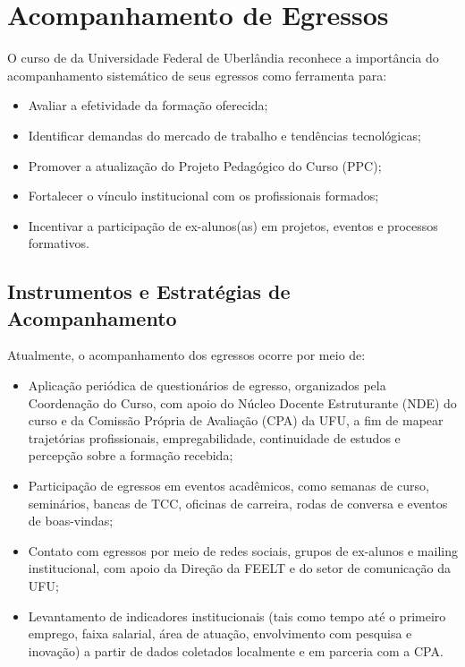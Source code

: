 \chapter{Acompanhamento de Egressos}

O curso de \nomecursonovo da Universidade Federal de Uberlândia reconhece a importância do acompanhamento sistemático de seus egressos como ferramenta para:

\begin{itemize}
    \item Avaliar a efetividade da formação oferecida;
    \item Identificar demandas do mercado de trabalho e tendências tecnológicas;
    \item Promover a atualização do Projeto Pedagógico do Curso (PPC);
    \item Fortalecer o vínculo institucional com os profissionais formados;
    \item Incentivar a participação de ex-alunos(as) em projetos, eventos e processos formativos.
\end{itemize}

\section{Instrumentos e Estratégias de Acompanhamento}

Atualmente, o acompanhamento dos egressos ocorre por meio de:

\begin{itemize}
    \item Aplicação periódica de questionários de egresso, organizados pela Coordenação do Curso, com apoio do Núcleo Docente Estruturante (NDE) do curso e da Comissão Própria de Avaliação (CPA) da UFU, a fim de mapear trajetórias profissionais, empregabilidade, continuidade de estudos e percepção sobre a formação recebida;
    \item Participação de egressos em eventos acadêmicos, como semanas de curso, seminários, bancas de TCC, oficinas de carreira, rodas de conversa e eventos de boas-vindas;
    \item Contato com egressos por meio de redes sociais, grupos de ex-alunos e mailing institucional, com apoio da Direção da FEELT e do setor de comunicação da UFU;
    \item Levantamento de indicadores institucionais (tais como tempo até o primeiro emprego, faixa salarial, área de atuação, envolvimento com pesquisa e inovação) a partir de dados coletados localmente e em parceria com a CPA.
\end{itemize}
    
